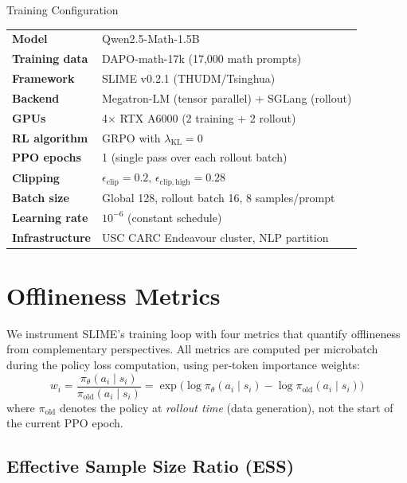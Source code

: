 \documentclass[11pt,a4paper]{article}
\begin{document}
\begin{configbox}{Training Configuration}
\begin{tabular}{@{}ll@{}}
  \textbf{Model} & Qwen2.5-Math-1.5B \\
  \textbf{Training data} & DAPO-math-17k (17{,}000 math prompts) \\
  \textbf{Framework} & SLIME v0.2.1 (THUDM/Tsinghua) \\
  \textbf{Backend} & Megatron-LM (tensor parallel) + SGLang (rollout) \\
  \textbf{GPUs} & 4$\times$ RTX A6000 (2 training + 2 rollout) \\
  \textbf{RL algorithm} & GRPO with $\lambda_{\mathrm{KL}} = 0$ \\
  \textbf{PPO epochs} & 1 (single pass over each rollout batch) \\
  \textbf{Clipping} & $\epsilon_{\mathrm{clip}} = 0.2$, $\epsilon_{\mathrm{clip,high}} = 0.28$ \\
  \textbf{Batch size} & Global 128, rollout batch 16, 8 samples/prompt \\
  \textbf{Learning rate} & $10^{-6}$ (constant schedule) \\
  \textbf{Infrastructure} & USC CARC Endeavour cluster, NLP partition \\
\end{tabular}
\end{configbox}


\section{Offlineness Metrics}
\label{sec:metrics}

We instrument SLIME's training loop with four metrics that quantify offlineness
from complementary perspectives. All metrics are computed per microbatch during
the policy loss computation, using per-token importance weights:
\[
  w_i = \frac{\pi_\theta(a_i \mid s_i)}{\pi_{\mathrm{old}}(a_i \mid s_i)}
      = \exp\!\bigl(\log\pi_\theta(a_i \mid s_i) - \log\pi_{\mathrm{old}}(a_i \mid s_i)\bigr)
\]
where $\pi_{\mathrm{old}}$ denotes the policy at \emph{rollout time} (data
generation), not the start of the current PPO epoch.

\subsection{Effective Sample Size Ratio (ESS)}
\end{document}

